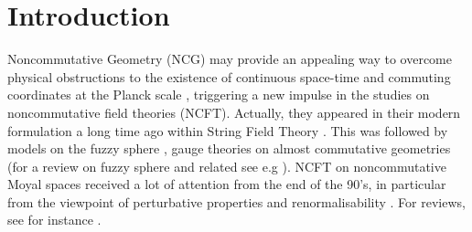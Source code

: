 \documentclass[a4paper,11pt,twoside]{article}
\numberwithin{equation}{section}
\theoremstyle{nonumberplain}
\newcounter{and}
\begin{document}
\newpage


\section{Introduction}

Noncommutative Geometry (NCG) \cite{Connes} may provide an appealing way to overcome physical obstructions to the existence of continuous space-time and commuting coordinates at the Planck scale \cite{Doplich1}, triggering a new impulse in the studies on noncommutative field theories (NCFT). Actually, they appeared in their modern formulation a long time ago within String Field Theory \cite{witt1}. This was followed by models on the fuzzy sphere \cite{gm90}, gauge theories on almost commutative geometries \cite{mdv1} (for a review on fuzzy sphere and related see e.g \cite{madorebook}). NCFT on noncommutative Moyal spaces received a lot of attention from the end of the 90's, in particular from the viewpoint of perturbative properties and renormalisability \cite{minwala, Chepelev}. For reviews, see for instance \cite{dnsw-rev}.\par 
\end{document}
